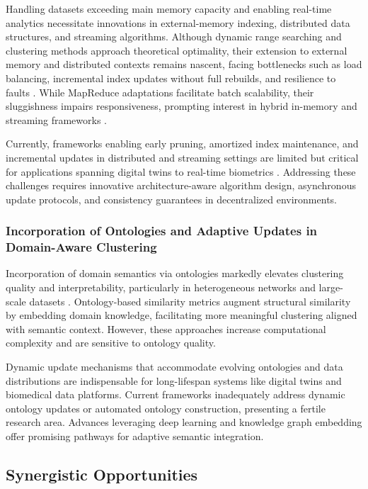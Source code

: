 \documentclass[11pt]{article}
\begin{document}
Handling datasets exceeding main memory capacity and enabling real-time analytics necessitate innovations in external-memory indexing, distributed data structures, and streaming algorithms. Although dynamic range searching and clustering methods approach theoretical optimality, their extension to external memory and distributed contexts remains nascent, facing bottlenecks such as load balancing, incremental index updates without full rebuilds, and resilience to faults \cite{ref3, ref7}. While MapReduce adaptations facilitate batch scalability, their sluggishness impairs responsiveness, prompting interest in hybrid in-memory and streaming frameworks \cite{ref22}.

Currently, frameworks enabling early pruning, amortized index maintenance, and incremental updates in distributed and streaming settings are limited but critical for applications spanning digital twins to real-time biometrics \cite{ref26, ref29}. Addressing these challenges requires innovative architecture-aware algorithm design, asynchronous update protocols, and consistency guarantees in decentralized environments.

\subsubsection{Incorporation of Ontologies and Adaptive Updates in Domain-Aware Clustering}

Incorporation of domain semantics via ontologies markedly elevates clustering quality and interpretability, particularly in heterogeneous networks and large-scale datasets \cite{ref23}. Ontology-based similarity metrics augment structural similarity by embedding domain knowledge, facilitating more meaningful clustering aligned with semantic context. However, these approaches increase computational complexity and are sensitive to ontology quality.

Dynamic update mechanisms that accommodate evolving ontologies and data distributions are indispensable for long-lifespan systems like digital twins and biomedical data platforms. Current frameworks inadequately address dynamic ontology updates or automated ontology construction, presenting a fertile research area. Advances leveraging deep learning and knowledge graph embedding offer promising pathways for adaptive semantic integration.

\subsection{Synergistic Opportunities}
\end{document}
